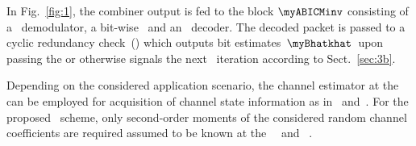 In Fig.~\ref{fig:1}, the combiner output is fed to the block $\myABICMinv$
consisting of a \myQAM\ demodulator, a bit-wise \myDeinterleaver\ and
an \myLDPC\ decoder. The decoded packet is passed to a cyclic
redundancy check~(\myCRC{}) which outputs bit estimates~$\myBhatkhat$~upon passing the \myCRC{} or otherwise signals the next \myTHARQ\ iteration according to Sect.~\ref{sec:3b}.

Depending on the considered application scenario, the channel
estimator at the \mySU{} \myRX{} can be employed for acquisition of channel state information as in~\cite{Su2014_alt} and~\cite{Sharma2017_alt}. For the proposed \myCLO\ scheme, only second-order moments of the considered random channel coefficients are required assumed to be known at the \mySU\ \myTX\ and \mySU\ \myRX{}.

